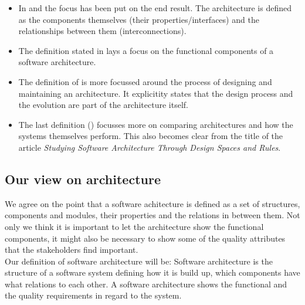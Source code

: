\documentclass{article}
\begin{document}
\begin{itemize}
\item In \cite{clemens} and \cite{hayesroth} the focus has been put on the end result. The architecture is defined as the components themselves (their properties/interfaces) and the relationships between them (interconnections).
\item The definition stated in \cite{hayesroth} lays a focus on the functional components of a software architecture.
\item The definition of \cite{IEEE1471} is more focussed around the process of designing and maintaining an architecture. It explicitity states that the design process and the evolution are part of the architecture itself.
\item The last definition (\cite{lane90}) focusses more on comparing architectures and how the systems themselves perform. This also becomes clear from the title of the article \emph{Studying Software Architecture Through Design Spaces and Rules}.

\end{itemize}

\subsection{Our view on architecture}

We agree on the point that a software achitecture is defined as a set of structures, components and modules, their properties and the relations in between them. 
Not only we think it is important to let the architecture show the functional components, it might also be necessary to show some of the quality attributes that the stakeholders find important. \\ 

Our definition of software architecture will be:
Software architecture is the structure of a software system defining how it is build up, which components have what relations to each other. 
A software architecture shows the functional and the quality requirements in regard to the system.

\end{document}
